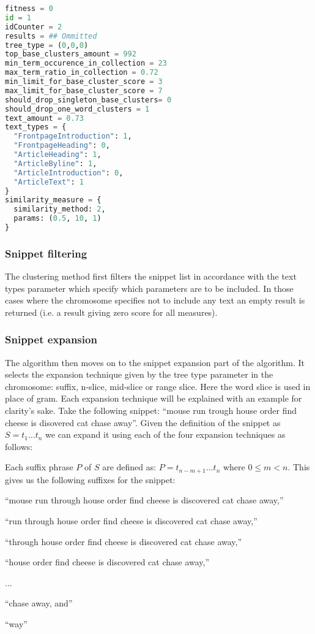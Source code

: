 \begin{lstlisting}[float=t, language=python, label=lst:chromosome, caption={An example chromosome}]
fitness = 0
id = 1
idCounter = 2
results = ## Ommitted
tree_type = (0,0,0)
top_base_clusters_amount = 992
min_term_occurence_in_collection = 23
max_term_ratio_in_collection = 0.72
min_limit_for_base_cluster_score = 3
max_limit_for_base_cluster_score = 7
should_drop_singleton_base_clusters= 0
should_drop_one_word_clusters = 1
text_amount = 0.73
text_types = {
  "FrontpageIntroduction": 1,
  "FrontpageHeading": 0,
  "ArticleHeading": 1,
  "ArticleByline": 1,
  "ArticleIntroduction": 0,
  "ArticleText": 1
}
similarity_measure = {
  similarity_method: 2,
  params: (0.5, 10, 1)
}
\end{lstlisting}

\subsubsection{Snippet filtering}
The clustering method first filters the snippet list in accordance with the text types parameter which specify which parameters are to be included. In those cases where the chromosome specifies not to include any text an empty result is returned (i.e. a result giving zero score for all measures).

\subsubsection{Snippet expansion}
The algorithm then moves on to the snippet expansion part of the \CTC algorithm. It selects the expansion technique given by the tree type parameter in the chromosome: suffix, n-slice, mid-slice or range slice. Here the word slice is used in place of gram. Each expansion technique will be explained with an example for clarity's sake. Take the following snippet: ``mouse run trough house order find cheese is disovered cat chase away''. Given the definition of the snippet as \(S = t_{1} \dots t_{n}\) we can expand it using each of the four expansion techniques as follows:

Each suffix phrase \(P\)  of \(S\) are defined as: \(P = t_{n-m+1} \dots t_{n}\) where \(0 \le m < n\). This gives us the following suffixes for the snippet:
\begin{inparaenum}[\itshape 1\upshape)]
\item ``mouse run through house order find cheese is discovered cat chase away,''
\item ``run through house order find cheese is discovered cat chase away,''
\item ``through house order find cheese is discovered cat chase away,''
\item ``house order find cheese is discovered cat chase away,''
\item ...
\item ``chase away, and''
\item ``way''
\end{inparaenum}


